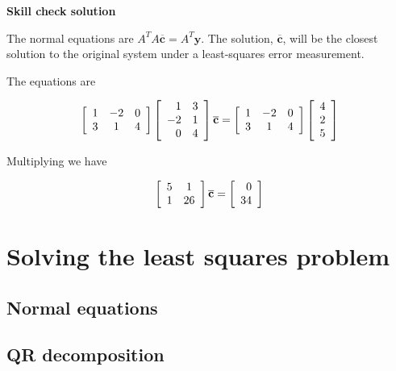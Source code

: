 \documentclass[12pt,letterpaper,noanswers]{exam}
\begin{document}
\noindent \textbf{Skill check solution}
\begin{questions}
\item The normal equations are $A^TA\overline{\mathbf{c}} = A^T\mathbf{y}$.  The solution, $\overline{\mathbf{c}}$, will be the closest solution to the original system under a least-squares error measurement.

The equations are

\[\left[\begin{array}{c c c}
1 & -2 & 0 \\
3 & 1 & 4
\end{array}\right]\left[\begin{array}{r r}
1 & 3 \\
-2 & 1 \\
0 & 4
\end{array}\right] \overline{\mathbf{c}}= \left[\begin{array}{c c c}
1 & -2 & 0 \\
3 & 1 & 4
\end{array}\right] \left[\begin{array}{ r}
4 \\ 2 \\ 5\end{array}\right]\]

Multiplying we have

\[\left[\begin{array}{c c}
5 & 1 \\
1 & 26
\end{array}\right]\overline{\mathbf{c}}= \left[\begin{array}{ r}
0 \\ 34\end{array}\right]\]

\end{questions}

\section{Solving the least squares problem}

\subsection{Normal equations}


\subsection{QR decomposition}
\end{document}
